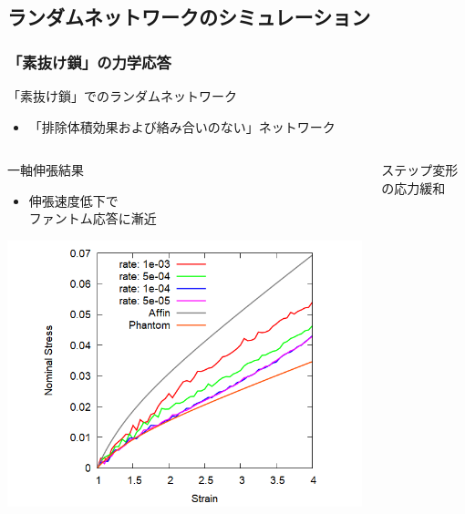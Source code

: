 \documentclass[12pt, dvipdfmx]{beamer}
\begin{document}
\subsection{ランダムネットワークのシミュレーション}
\begin{frame}
	\frametitle{「素抜け鎖」の力学応答}
		\begin{alertblock}{「素抜け鎖」でのランダムネットワーク}
			\begin{itemize}
				\item \alert{「排除体積効果および絡み合いのない」}ネットワーク
			\end{itemize}
        \end{alertblock}
        \vspace{-3mm}
		\begin{columns}[totalwidth=\linewidth]
				\begin{block}{一軸伸張結果}
					\begin{itemize}
						\item 伸張速度低下で\\\alert{ファントム応答}に漸近
                    \end{itemize}
                    \begin{center}
                        \includegraphics[width=.9\columnwidth]{N48_sunuke.png}
                    \end{center}
				\end{block}
				\begin{exampleblock}{ステップ変形の応力緩和}
                    \begin{itemize}

\end{itemize}
\end{exampleblock}
\end{columns}
\end{frame}
\end{document}
